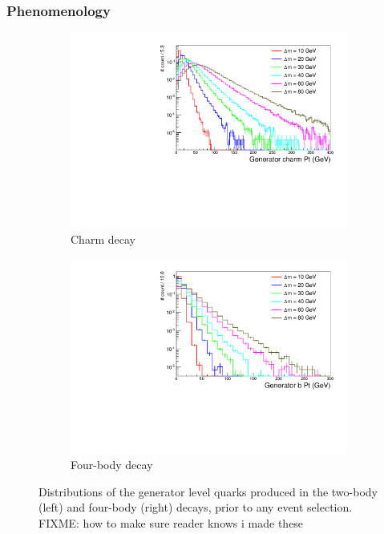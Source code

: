 \subsubsection{Phenomenology}

\begin{figure}[h!]
  \centering
  \begin{subfigure}[b]{0.46\textwidth}
    \includegraphics[width=\textwidth]{Figs/genlevel/compar_charmPt_0_0_inc_inc_T2cc_noCuts_sitv_log.pdf}
    \caption{Charm decay}
    \label{fig:t2cc_gen_charm_pt}
  \end{subfigure}
  \begin{subfigure}[b]{0.46\textwidth}
    \includegraphics[width=\textwidth]{Figs/genlevel/compar_T2_4body_genBPt_0_inc_inc_T2_noCuts_sitv_log.pdf}
    \caption{Four-body decay}
    \label{fig:t2degen_gen_b_pt}
  \end{subfigure}
  \caption{Distributions of the generator level quarks produced in the two-body
  (left) and four-body (right) decays, prior to any event selection. FIXME: how to make sure reader knows i made these}
  \label{fig:gen_quark_pt}
\end{figure}

